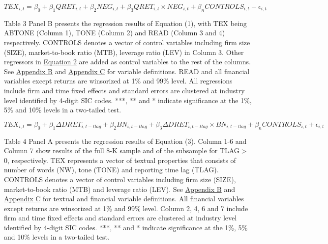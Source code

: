 \newpage

\setcounter{equation}{0}
\begin{equation}
	TEX_{i,t}=\beta_0+\beta_1QRET_{i,t}+\beta_2NEG_{i,t}+\beta_3QRET_{i,t}\times NEG_{i,t}+\beta_nCONTROLS_{i,t}+\epsilon_{i,t}
\end{equation}

Table 3 Panel B presents the regression results of Equation (1), with TEX being ABTONE (Column 1), TONE (Column 2) and READ (Column 3 and 4) respectively. CONTROLS denotes a vector of control variables including firm size (SIZE), market-to-book ratio (MTB), leverage ratio (LEV) in Column 3. Other regressors in \hyperref[eq2]{Equation 2} are added as control variables to the rest of the columns. See \hyperref[appb]{Appendix B} and \hyperref[appc]{Appendix C} for variable definitions. READ and all financial variables except returns are winsorized at 1\% and 99\% level. All regressions include firm and time fixed effects and standard errors are clustered at industry level identified by 4-digit SIC codes. ***, ** and * indicate significance at the 1\%, 5\% and 10\% levels in a two-tailed test.

\newpage

\setcounter{equation}{2}
\begin{equation}
TEX_{i,t}=\beta_0+\beta_1\Delta DRET_{i,t-tlag}+\beta_2BN_{i,t-tlag}+\beta_3\Delta DRET_{i,t-tlag}\times BN_{i,t-tlag}+\beta_nCONTROLS_{i,t}+\epsilon_{i,t}
\end{equation}

Table 4 Panel A presents the regression results of Equation (3). Column 1-6 and Column 7 show results of the full 8-K sample and of the subsample for TLAG$>$0, respectively. TEX represents a vector of textual properties that consists of number of words (NW), tone (TONE) and reporting time lag (TLAG). CONTROLS denotes a vector of control variables including firm size (SIZE), market-to-book ratio (MTB) and leverage ratio (LEV). See \hyperref[appb]{Appendix B} and \hyperref[appc]{Appendix C} for textual and financial variable definitions. All financial variables except returns are winsorized at 1\% and 99\% level. Column 2, 4, 6 and 7 include firm and time fixed effects and standard errors are clustered at industry level identified by 4-digit SIC codes. ***, ** and * indicate significance at the 1\%, 5\% and 10\% levels in a two-tailed test.

